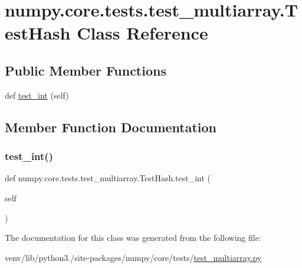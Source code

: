 \hypertarget{classnumpy_1_1core_1_1tests_1_1test__multiarray_1_1TestHash}{}\section{numpy.\+core.\+tests.\+test\+\_\+multiarray.\+Test\+Hash Class Reference}
\label{classnumpy_1_1core_1_1tests_1_1test__multiarray_1_1TestHash}
\subsection*{Public Member Functions}
\begin{DoxyCompactItemize}
\item 
def \hyperlink{classnumpy_1_1core_1_1tests_1_1test__multiarray_1_1TestHash_a9294e12ad98c8d4be3b2f6d1de390061}{test\+\_\+int} (self)
\end{DoxyCompactItemize}


\subsection{Member Function Documentation}
\mbox{\label{classnumpy_1_1core_1_1tests_1_1test__multiarray_1_1TestHash_a9294e12ad98c8d4be3b2f6d1de390061}} 
\subsubsection{\texorpdfstring{test\+\_\+int()}{test\_int()}}
{\footnotesize\ttfamily def numpy.\+core.\+tests.\+test\+\_\+multiarray.\+Test\+Hash.\+test\+\_\+int (\begin{DoxyParamCaption}\item[{}]{self }\end{DoxyParamCaption})}



The documentation for this class was generated from the following file\+:\begin{DoxyCompactItemize}
\item 
venv/lib/python3./site-\/packages/numpy/core/tests/\hyperlink{core_2tests_2test__multiarray_8py}{test\+\_\+multiarray.\+py}\end{DoxyCompactItemize}
